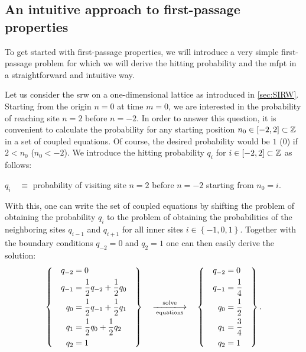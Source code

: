 \subsection{An intuitive approach to first-passage properties}\label{ssec:intApproach}
To get started with first-passage properties, we will introduce a very simple first-passage problem for which we will derive the hitting probability and the \ac{mfpt} in a straightforward and intuitive way.

Let us consider the \ac{srw} on a one-dimensional lattice as introduced in \autoref{sec:SIRW}. Starting from the origin $n=0$ at time $m=0$, we are interested in the probability of reaching site $n=2$ before \mbox{$n=-2$}. In order to answer this question, it is convenient to calculate the probability for any starting position $n_0\in\left[-2,2\right]\subset\operatorname{\mathbb{Z}}$ in a set of coupled equations. Of course, the desired probability would be $1$ ($0$) if $2 < n_0$ ($n_0 < -2$). We introduce the hitting probability $q_i$ for $i\in\left[-2,2\right]\subset\operatorname{\mathbb{Z}}$ as follows:
\begin{center}
 $q_i \quad \equiv$ \quad probability of visiting site $n=2$ before $n=-2$ starting from $n_0=i$.
\end{center}
With this, one can write the set of coupled equations by shifting the problem of obtaining the probability $q_i$ to the problem of obtaining the probabilities of the neighboring sites $q_{i-1}$ and $q_{i+1}$ for all inner sites $i \in \left\{-1,0,1\right\}$. Together with the boundary conditions $q_{-2}=0$ and $q_2=1$ one can then easily derive the solution:
\begin{equation*}
 \left\{\quad
 \begin{aligned}
  q_{-2} &= 0
  \\
  q_{-1} &= \frac{1}{2}q_{-2}+\frac{1}{2}q_{0}
  \\
  q_{0} &= \frac{1}{2}q_{-1}+\frac{1}{2}q_{1}
  \\
  q_{1} &= \frac{1}{2}q_{0}+\frac{1}{2}q_{2}
  \\
  q_{2} &= 1  
 \end{aligned}
 \quad
 \right\} \quad \xlongrightarrow[\textrm{equations}]{\textrm{solve}} \quad \left\{\quad
 \begin{aligned}
  q_{-2} &= 0
  \\
  q_{-1} &= \frac{1}{4}
  \\
  q_{0} &= \frac{1}{2}
  \\
  q_{1} &= \frac{3}{4}
  \\
  q_{2} &= 1
 \end{aligned}
 \quad
 \right\}.
\end{equation*}
